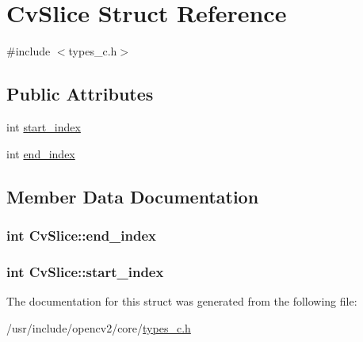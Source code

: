 \hypertarget{structCvSlice}{\section{Cv\-Slice Struct Reference}
\label{structCvSlice}
}


{\ttfamily \#include $<$types\-\_\-c.\-h$>$}

\subsection*{Public Attributes}
\begin{DoxyCompactItemize}
\item 
int \hyperlink{structCvSlice_ac39003148a22277cf185e07de861d533}{start\-\_\-index}
\item 
int \hyperlink{structCvSlice_a00e242676365824b589246ec58ee8d0d}{end\-\_\-index}
\end{DoxyCompactItemize}


\subsection{Member Data Documentation}
\hypertarget{structCvSlice_a00e242676365824b589246ec58ee8d0d}{
\subsubsection[{end\-\_\-index}]{\setlength{\rightskip}{0pt plus 5cm}int Cv\-Slice\-::end\-\_\-index}}\label{structCvSlice_a00e242676365824b589246ec58ee8d0d}
\hypertarget{structCvSlice_ac39003148a22277cf185e07de861d533}{
\subsubsection[{start\-\_\-index}]{\setlength{\rightskip}{0pt plus 5cm}int Cv\-Slice\-::start\-\_\-index}}\label{structCvSlice_ac39003148a22277cf185e07de861d533}


The documentation for this struct was generated from the following file\-:\begin{DoxyCompactItemize}
\item 
/usr/include/opencv2/core/\hyperlink{core_2types__c_8h}{types\-\_\-c.\-h}\end{DoxyCompactItemize}
